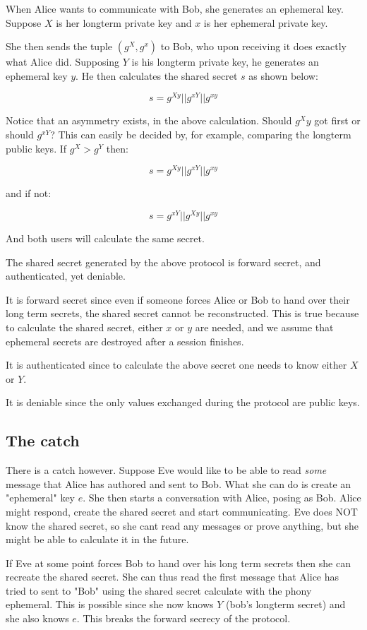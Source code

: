 When Alice wants to communicate with Bob, she generates an ephemeral \dhname key.
Suppose $X$ is her longterm private key and $x$ is her ephemeral private key.

She then sends the tuple $(g^X, g^x)$ to Bob, who upon receiving it does exactly what Alice did.
Supposing $Y$ is his longterm private key, he generates an ephemeral key $y$.
He then calculates the shared secret $s$ as shown below:

\[
  s = g^{Xy} || g^{xY} || g^{xy}
\]

Notice that an asymmetry exists, in the above calculation.
Should $g^Xy$ got first or should $g^{xY}$?
This can easily be decided by, for example, comparing the longterm public keys.
If $g^X > g^Y$ then:

\[
  s = g^{Xy} || g^{xY} || g^{xy}
\]

and if not:

\[
  s = g^{xY}|| g^{Xy} || g^{xy}
\]

And both users will calculate the same secret.

The shared secret generated by the above protocol is forward secret, and authenticated, yet deniable.

It is forward secret since even if someone forces Alice or Bob to hand over their long term secrets, the shared secret cannot be reconstructed.
This is true because to calculate the shared secret, either $x$ or $y$ are needed, and we assume that ephemeral secrets are destroyed after a session finishes.

It is authenticated since to calculate the above secret one needs to know either $X$ or $Y$.

It is deniable since the only values exchanged during the protocol are public keys.

\subsection{The catch}

There is a catch however. Suppose Eve would like to be able to read \emph{some} message that Alice has authored and sent to Bob.
What she can do is create an "ephemeral" key $e$.
She then starts a conversation with Alice, posing as Bob.
Alice might respond, create the shared secret and start communicating.
Eve does NOT know the shared secret, so she cant read any messages or prove anything, but she might be able to calculate it in the future.

If Eve at some point forces Bob to hand over his long term secrets then she can recreate the shared secret.
She can thus read the first message that Alice has tried to sent to "Bob" using the shared secret calculate with the phony ephemeral.
This is possible since she now knows $Y$ (bob's longterm secret) and she also knows $e$.
This breaks the forward secrecy of the protocol.

